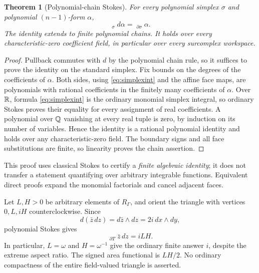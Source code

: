 \documentclass[11pt,letterpaper]{article}
\newtheorem{theorem}{Theorem}[section]
\theoremstyle{definition}
\theoremstyle{remark}
\newcommand{\PInt}{\mathop{\int^{\!\mathrm{pol}}}\nolimits}\newcommand{\ACoint}{\mathop{\oint^{\!\mathrm{alg}}}\nolimits}
\numberwithin{equation}{section}
\begin{document}
\begin{theorem}[Polynomial-chain Stokes]\label{thm:pol-stokes}
For every polynomial simplex $\sigma$ and polynomial $(n-1)$-form $\alpha$,
\begin{equation}\label{eq:pol-stokes}
 \PInt_\sigma d\alpha=\PInt_{\partial\sigma}\alpha.
\end{equation}
The identity extends to finite polynomial chains. It holds over every characteristic-zero coefficient field, in particular over every surcomplex workspace.
\end{theorem}
\begin{proof}
Pullback commutes with $d$ by the polynomial chain rule, so it suffices to prove the identity on the standard simplex. Fix bounds on the degrees of the coefficients of $\alpha$. Both sides, using \eqref{eq:simplexint} and the affine face maps, are polynomials with rational coefficients in the finitely many coefficients of $\alpha$. Over $\mathbb R$, formula \eqref{eq:simplexint} is the ordinary monomial simplex integral, so ordinary Stokes proves their equality for every assignment of real coefficients. A polynomial over $\mathbb Q$ vanishing at every real tuple is zero, by induction on its number of variables. Hence the identity is a rational polynomial identity and holds over any characteristic-zero field. The boundary signs and all face substitutions are finite, so linearity proves the chain assertion.
\end{proof}

This proof uses classical Stokes to certify a \emph{finite algebraic identity}; it does not transfer a statement quantifying over arbitrary integrable functions. Equivalent direct proofs expand the monomial factorials and cancel adjacent faces.

\begin{example}\label{ex:triangle}
Let $L,H>0$ be arbitrary elements of $R_\Gamma$, and orient the triangle with vertices $0,L,iH$ counterclockwise. Since
\[
 d(\bar z\,dz)=d\bar z\wedge dz=2i\,dx\wedge dy,
\]
polynomial Stokes gives
\begin{equation}\label{eq:triangle}
 \PInt_{\partial T}\bar z\,dz=iLH.
\end{equation}
In particular, $L=\omega$ and $H=\omega^{-1}$ give the ordinary finite answer $i$, despite the extreme aspect ratio. The signed area functional is $LH/2$. No ordinary compactness of the entire field-valued triangle is asserted.
\end{example}
\end{document}
